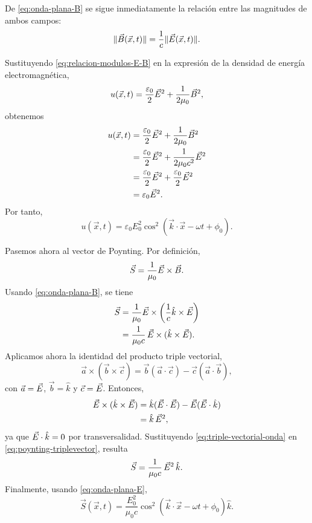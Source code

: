 \documentclass[../main.tex]{subfiles}
\begin{document}
De \eqref{eq:onda-plana-B} se sigue inmediatamente la relación entre las magnitudes de ambos campos:
\begin{equation}
    \|\vec{B}(\vec x,t)\|=\frac{1}{c}\|\vec{E}(\vec x,t)\|.
    \label{eq:relacion-modulos-E-B}
\end{equation}

Sustituyendo \eqref{eq:relacion-modulos-E-B} en la expresión de la densidad de energía electromagnética,
\begin{equation*}
    u(\vec x,t)=\frac{\varepsilon_0}{2}\vec{E}^2+\frac{1}{2\mu_0}\vec{B}^2,
\end{equation*}
obtenemos
\begin{align}
    u(\vec x,t)
    &=\frac{\varepsilon_0}{2}\vec{E}^2+\frac{1}{2\mu_0}\vec{B}^2 \notag\\
    &=\frac{\varepsilon_0}{2}\vec{E}^2+\frac{1}{2\mu_0 c^2}\vec{E}^2 \notag\\
    &=\frac{\varepsilon_0}{2}\vec{E}^2+\frac{\varepsilon_0}{2}\vec{E}^2 \notag\\
    &=\varepsilon_0\vec{E}^2.
    \label{eq:u-onda-plana}
\end{align}
Por tanto,
\begin{equation*}
    u(\vec x,t)=\varepsilon_0 E_0^2\cos^2\!\left(\vec k\cdot\vec x-\omega t+\phi_0\right).
\end{equation*}

Pasemos ahora al vector de Poynting. Por definición,
\begin{equation*}
    \vec S=\frac{1}{\mu_0}\vec{E}\times\vec{B}.
\end{equation*}
Usando \eqref{eq:onda-plana-B}, se tiene
\begin{align}
    \vec S
    &=\frac{1}{\mu_0}\vec{E}\times\left(\frac{1}{c}\hat k\times\vec{E}\right) \notag\\
    &=\frac{1}{\mu_0 c}\,\vec{E}\times(\hat k\times\vec{E}).
    \label{eq:poynting-triplevector}
\end{align}
Aplicamos ahora la identidad del producto triple vectorial,
\begin{equation*}
    \vec a\times(\vec b\times\vec c)=\vec b(\vec a\cdot\vec c)-\vec c(\vec a\cdot\vec b),
\end{equation*}
con \(\vec a=\vec{E}\), \(\vec b=\hat k\) y \(\vec c=\vec{E}\). Entonces,
\begin{align}
    \vec{E}\times(\hat k\times\vec{E})
    &=\hat k(\vec{E}\cdot\vec{E})-\vec{E}(\vec{E}\cdot\hat k) \notag\\
    &=\hat k\,\vec{E}^2,
    \label{eq:triple-vectorial-onda}
\end{align}
ya que \(\vec{E}\cdot\hat k=0\) por transversalidad. Sustituyendo \eqref{eq:triple-vectorial-onda} en \eqref{eq:poynting-triplevector}, resulta
\begin{equation}
    \vec S=\frac{1}{\mu_0 c}\,\vec{E}^2\,\hat k.
    \label{eq:poynting-onda-plana}
\end{equation}
Finalmente, usando \eqref{eq:onda-plana-E},
\begin{equation}
    \vec S(\vec x,t)
    =
    \frac{E_0^2}{\mu_0 c}
    \cos^2\!\left(\vec k\cdot\vec x-\omega t+\phi_0\right)\hat k.
    \label{eq:poynting-onda-plana-explicita}
\end{equation}
\end{document}
